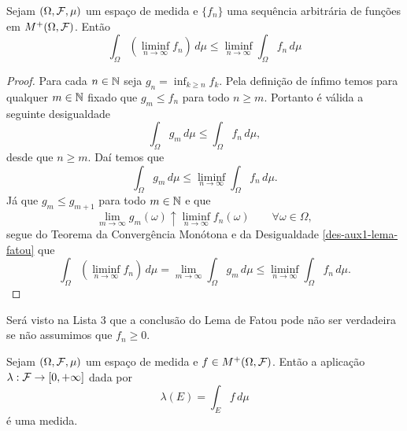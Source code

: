 \begin{lema}
Sejam $(\Omega,\mathcal{F},\mu)$ um espaço de medida e 
$\{f_n\}$ uma sequência arbitrária de 
funções em $M^+(\Omega,\mathcal{F})$. Então 
	\[
		\int_{\Omega}\left( \liminf_{n\to\infty} f_n\right) \, d\mu
		\leq
		\liminf_{n\to\infty} \int_{\Omega}f_n\, d\mu
	\]
\end{lema}


\begin{proof}
Para cada $n\in\mathbb{N}$ seja $g_n =\inf_{k\geq n} f_k$.
Pela definição de ínfimo temos para
qualquer $m\in \mathbb{N}$ fixado que $g_m\leq f_n$
para todo $n\geq m$. Portanto é válida a 
seguinte desigualdade
	\[
	\int_{\Omega} g_m\, d\mu
	\leq
	\int_{\Omega} f_n\, d\mu,
	\] 
desde que $n\geq m$. Daí temos que
	\begin{equation}\label{des-aux1-lema-fatou}
	\int_{\Omega} g_m\, d\mu
	\leq
	\liminf_{n\to\infty}\int_{\Omega} f_n\, d\mu.
	\end{equation} 
Já que $g_{m}\leq g_{m+1}$ para todo $m\in\mathbb{N}$ 
e que 
\[	
	\lim_{m\to\infty} g_m(\omega) 
	\uparrow 
	\liminf_{n\to\infty} f_n(\omega)
	\qquad
	\forall \omega\in\Omega,
\]
segue do Teorema da Convergência Monótona e 
da Desigualdade \eqref{des-aux1-lema-fatou} que 
\[
	\int_{\Omega} \left( \liminf_{n\to\infty} f_n\right) \, d\mu
	=
	\lim_{m\to\infty}\int_{\Omega} g_m\, d\mu
	\leq
	\liminf_{n\to\infty}\int_{\Omega} f_n\, d\mu.
\]
\end{proof}






\begin{observacao}
Será visto na Lista 3 que a conclusão do Lema 
de Fatou pode não ser verdadeira se não assumimos que 
$f_n\geq 0$.
\end{observacao}





\begin{corolario}\label{cor-lambda(E)-eh-uma-medida}
Sejam $(\Omega,\mathcal{F},\mu)$ um espaço de medida e 
$f\in M^{+}(\Omega,\mathcal{F})$. Então a aplicação 
$\lambda:\mathcal{F}\to[0,+\infty]$ dada por
	\[
		\lambda(E) 
		=
		\int_{E} f\, d\mu
	\]
é uma medida.
\end{corolario}


